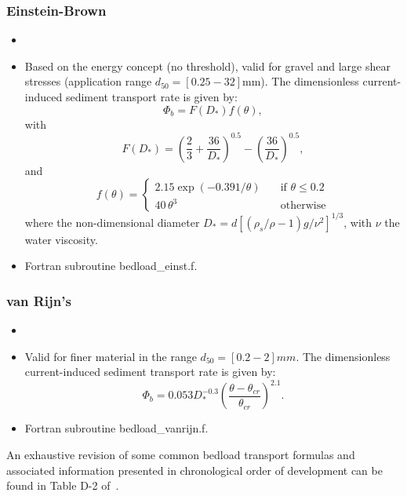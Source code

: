 \subsubsection{Einstein-Brown}
\begin{itemize}
\item {}
\item Based on the energy concept (no threshold), valid for gravel and large shear
stresses (application range $d_{50} = [0.25-32]$mm). The dimensionless current-induced sediment transport rate is given by:
\begin{equation*}
\Phi_b = F(D_*)f(\theta), 
\end{equation*}
with
\begin{equation*}\label{eq:EinsteinFDs}
F(D_*) = \left(\frac{2}{3} +\frac{36}{D_*}\right)^{0.5} - \left( \frac{36}{D_*}\right)^{0.5}, 
\end{equation*}
and
\begin{equation*}
f(\theta)=\left\{\begin{array}{ll}
2.15\exp(-0.391/\theta) & \quad\text{if}\,\,\theta \leq 0.2 \\
40\,\theta^{3}          & \quad\text{otherwise}
\end{array}
\right.
\end{equation*}
where the non-dimensional diameter $D_*=d[(\rho_s/\rho-1)g/\nu^2]^{1/3}$, with $\nu$ the water viscosity.
\item Fortran subroutine {\ttfamily bedload\_einst.f}.
\end{itemize}

\subsubsection{van Rijn's}
\begin{itemize}
\item {}
\item Valid for finer material in the range $d_{50} = [0.2-2]mm$. The dimensionless current-induced sediment transport rate is given by:
\begin{equation*}
\Phi_b = 0.053 D_*^{-0.3} \left( \frac{\theta-\theta_{cr}}{\theta_{cr}} \right)^{2.1}.
\end{equation*}

\item Fortran subroutine {\ttfamily bedload\_vanrijn.f}.
\end{itemize}

\noindent
An exhaustive revision of some common bedload transport formulas and associated information presented in chronological order of development can be found in Table D-2 of~\cite{GarciaBook2006}.


